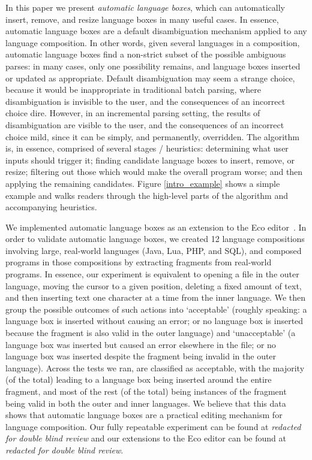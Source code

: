 \documentclass[sigplan,screen]{acmart}\settopmatter{printfolios=true,printccs=false,printacmref=false}
\begin{document}
In this paper we present \emph{automatic language boxes}, which can
automatically insert, remove, and resize language boxes in many useful cases.
In essence, automatic language boxes are a default disambiguation mechanism
applied to any language composition. In other words, given several languages in
a composition, automatic language boxes find a non-strict subset of the
possible ambiguous parses: in many cases, only one possibility remains, and
language boxes inserted or updated as appropriate. Default disambiguation may
seem a strange choice, because it would be inappropriate in traditional batch
parsing, where disambiguation is invisible to the user, and the consequences of
an incorrect choice dire. However, in an incremental parsing setting, the
results of disambiguation are visible to the user, and the consequences of an
incorrect choice mild, since it can be simply, and permanently, overridden. The
algorithm is, in essence, comprised of several stages / heuristics: determining what user
inputs should trigger it; finding candidate language boxes to insert, remove,
or resize; filtering out those which would make the overall program worse; and
then applying the remaining candidates. Figure \ref{intro_example} shows a
simple example and walks readers through the high-level parts of the algorithm
and accompanying heuristics.

We implemented automatic language boxes as an extension to the Eco
editor~\cite{diekmann14eco}. In order to validate automatic language boxes, we
created 12 language compositions involving large, real-world languages
(Java, Lua, PHP, and SQL),
and composed programs in those compositions by extracting fragments from real-world programs.
In essence, our experiment is equivalent to opening a file
in the outer language, moving the cursor to a given position, deleting a fixed amount
of text, and then inserting text one character at a time from the inner language.
We then group the possible outcomes of such actions into `acceptable' (roughly
speaking: a language box is inserted without causing an error; or no language
box is inserted because the fragment is also valid in the outer language) and
`unacceptable' (a language box was inserted but caused an error elsewhere in
the file; or no language box was inserted despite the fragment being invalid in
the outer language). Across the \totalinsertions tests we ran, \validalloverall are
classified as acceptable, with the majority
(\breakdownallvalidsame of the total) leading to a language box being inserted
around the entire fragment, and most of the rest (\breakdownallnovalid of the total)
being instances of the fragment being valid in both the outer and inner
languages. We believe that this data shows that automatic language boxes
are a practical editing mechanism for language composition.
Our fully
repeatable experiment can be found at \emph{redacted for double blind review}
and our extensions to the Eco editor can be found at \emph{redacted for double
blind review}.
\end{document}
